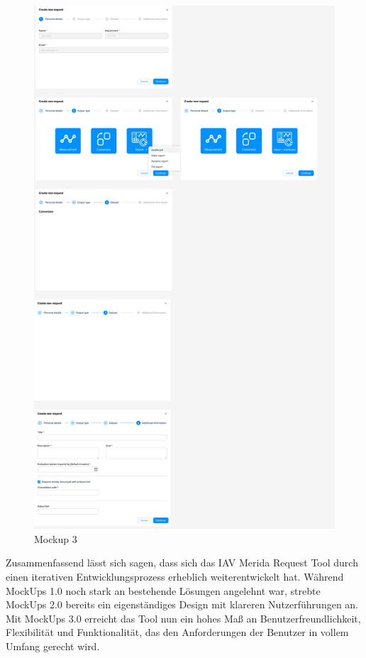 \begin{figure}[H]
    \centering
    \includegraphics[scale=.2]{media/MockUps3.0}
    \caption{Mockup 3}
    \label{fig:MockUps3.0}
\end{figure}
Zusammenfassend lässt sich sagen, dass sich das IAV Merida Request Tool durch einen iterativen Entwicklungsprozess erheblich weiterentwickelt hat. Während MockUps 1.0 noch stark an bestehende Lösungen angelehnt war, strebte MockUps 2.0 bereits ein eigenständiges Design mit klareren Nutzerführungen an. Mit MockUps 3.0 erreicht das Tool nun ein hohes Maß an Benutzerfreundlichkeit, Flexibilität und Funktionalität, das den Anforderungen der Benutzer in vollem Umfang gerecht wird.
\label{chap:kapitel5}